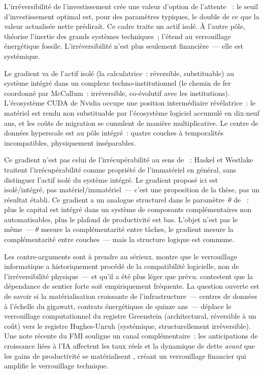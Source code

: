 L'irréversibilité de l'investissement crée une valeur d'option de l'attente \parencite{dixit_pindyck_1994}~: le seuil d'investissement optimal est, pour des paramètres typiques, le double de ce que la valeur actualisée nette prédirait. Ce cadre traite un actif isolé. À l'autre pôle, \textcite{hughes_networks_1983} théorise l'inertie des grands systèmes techniques~; \textcite{unruh_understanding_2000} l'étend au verrouillage énergétique fossile. L'irréversibilité n'est plus seulement financière~--- elle est systémique.

Le gradient va de l'actif isolé (la calculatrice~: réversible, substituable) au système intégré dans un complexe techno-institutionnel (le chemin de fer coordonné par McCallum~: irréversible, co-évolutif avec les institutions). L'écosystème CUDA de Nvidia occupe une position intermédiaire révélatrice~: le matériel est rendu non substituable par l'écosystème logiciel accumulé en dix-neuf ans, et les coûts de migration se cumulent de manière multiplicative. Le centre de données hyperscale est au pôle intégré~: quatre couches à temporalités incompatibles, physiquement inséparables.

Ce gradient n'est pas celui de l'irrécupérabilité au sens de \textcite{haskel_capitalism_2018}~: Haskel et Westlake traitent l'irrécupérabilité comme propriété de l'immatériel en général, sans distinguer l'actif isolé du système intégré. Le gradient proposé ici est isolé/intégré, pas matériel/immatériel~--- c'est une proposition de la thèse, pas un résultat établi. Ce gradient a un analogue structurel dans le paramètre~$\theta$ de \textcite{jones_ai_rd_2025}~: plus le capital est intégré dans un système de composants complémentaires non automatisables, plus le plafond de productivité est bas. L'objet n'est pas le même~--- $\theta$ mesure la complémentarité entre tâches, le gradient mesure la complémentarité entre couches~--- mais la structure logique est commune.

Les contre-arguments sont à prendre au sérieux. \textcite{greenstein_lock_in_1997} montre que le verrouillage informatique a historiquement procédé de la compatibilité logicielle, non de l'irréversibilité physique~--- et qu'il a été plus léger que prévu. \textcite{liebowitz_margolis_1995} contestent que la dépendance de sentier forte soit empiriquement fréquente. La question ouverte est de savoir si la matérialisation croissante de l'infrastructure~--- centres de données à l'échelle du gigawatt, contrats énergétiques de quinze ans~--- déplace le verrouillage computationnel du registre Greenstein (architectural, réversible à un coût) vers le registre Hughes-Unruh (systémique, structurellement irréversible). Une note récente du FMI souligne un canal complémentaire~: les anticipations de croissance liées à l'IA affectent les taux réels et la dynamique de dette \emph{avant} que les gains de productivité se matérialisent \parencite{barhoumi_imf_ai_2026}, créant un verrouillage financier qui amplifie le verrouillage technique.

